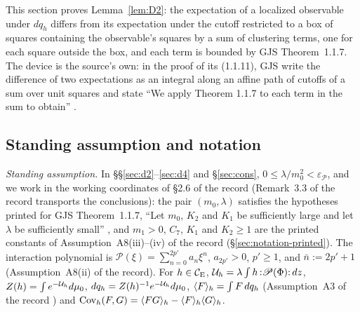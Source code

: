 
This section proves Lemma~\ref{lem:D2}: the expectation of a localized observable under $dq_h$
differs from its expectation under the cutoff restricted to a box of squares containing the
observable's squares by a sum of clustering terms, one for each square outside the box, and
each term is bounded by GJS Theorem~1.1.7.  The device is the source's own: in the proof of its
(1.1.11), GJS write the difference of two expectations as an integral along an affine path of
cutoffs of a sum over unit squares and state ``We apply Theorem 1.1.7 to each term in the sum to
obtain'' \cite[p.~595]{GJS}.

\subsection{Standing assumption and notation}\label{sub:d2-conv}

\emph{Standing assumption.}  In \S\S\ref{sec:d2}--\ref{sec:d4} and \S\ref{sec:cons},
$0\le\lambda/m_0^2<\varepsilon_{\mathscr P}$, and we work in the working coordinates of \S2.6 of
the record \cite[p.~14]{R} (Remark~3.3 of the record \cite[p.~16]{R} transports the conclusions):
the pair $(m_0,\lambda)$ satisfies the hypotheses printed for GJS Theorem~1.1.7, ``Let $m_0$,
$K_2$ and $K_1$ be sufficiently large and let $\lambda$ be sufficiently small''
\cite[p.~594]{GJS}, and $m_1>0$, $C_7$, $K_1$ and $K_2\ge1$ are the printed constants of
Assumption~A8(iii)--(iv) of the record \cite[p.~10]{R} (\S\ref{sec:notation-printed}).  The
interaction polynomial is $\mathscr P(\xi)=\sum_{n=0}^{2p'}a_n\xi^n$, $a_{2p'}>0$, $p'\ge1$, and
$\bar n:=2p'+1$ (Assumption~A8(ii) of the record).  For $h\in\mathcal{C}_{\mathrm E}$,
$\mathcal U_h=\lambda\int h\,{:}\mathscr P(\Phi){:}\,dz$, $Z(h)=\int e^{-\mathcal U_h}d\mu_0$,
$dq_h=Z(h)^{-1}e^{-\mathcal U_h}d\mu_0$, $\langle F\rangle_{h}=\int F\,dq_h$ (Assumption~A3 of the record
\cite[p.~8]{R}) and $\operatorname{Cov}_h(F,G)=\langle FG\rangle_{h}-\langle F\rangle_{h}\langle G\rangle_{h}$.

